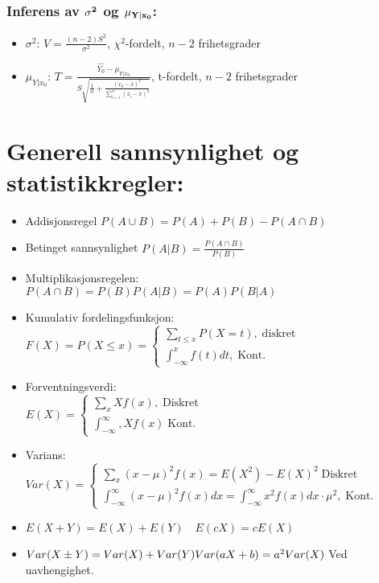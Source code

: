 \documentclass[12pt,a4paper,twocolumn,twoside]{article}
\begin{document}
\subsubsection*{Inferens av $\bold{\sigma^2}$ og $\bold{\mu_{Y|x_0}}$:}
\begin{itemize}[topsep=0pt,itemsep=0pt, partopsep=0pt]
    \item $\sigma^2$: $V=\frac{(n-2)S^2}{\sigma^2}$, $\chi^2$-fordelt, $n-2$ frihetsgrader
    \item $\mu_{Y|x_0}$: $T=\frac{\hat{Y_0}-\mu_{Y|x_0}}{S\sqrt{\frac{1}{n}+\frac{(x_0-\overline{x})^2}{\sum_{i=1}^n(x_i-\overline{x})^2}}}$, t-fordelt, $n-2$ frihetsgrader
\end{itemize}

%
%
\section*{Generell sannsynlighet og statistikkregler:}
\begin{itemize}[topsep=0pt,itemsep=0pt, partopsep=0pt]
    \item Addisjonsregel $P(A\cup B)=P(A)+P(B)-P(A\cap B)$
    \item Betinget sannsynlighet $P(A|B)=\frac{P(A\cap B)}{P(B)}$
    \item Multiplikasjonsregelen:\\$P(A\cap B)=P(B)P(A|B)=P(A)P(B|A)$
    \item Kumulativ fordelingsfunksjon: $F(X)=P(X\leq x)=\begin{cases}
        \sum_{t\leq x} P(X=t),\;\text{diskret}\\
        \int_{-\infty}^x f(t)dt,\;\text{Kont.}
    \end{cases}$
    \item Forventningsverdi:\\$E(X)=\begin{cases}
        \sum_x Xf(x),\;\text{Diskret}\\
        \int_{-\infty}^\infty,Xf(x)\;\text{Kont.}
    \end{cases}$
    \item Varians:\\$Var(X)=\begin{cases}
        \sum_x(x-\mu)^2f(x)=E(X^2)-E(X)^2\;\text{Diskret}\\
        \int_{-\infty}^\infty (x-\mu)^2f(x)dx = \int_{-\infty}^{\infty}x^2f(x)dx\cdot\mu^2,\;\text{Kont.}
    \end{cases}$
    \item $E(X+Y) = E(X)+E(Y)\quad E(cX)=cE(X)$
    \item $Var(X\pm Y) = Var(X)+Var(Y)\\ Var(aX+b)=a^2Var(X)$ Ved uavhengighet.
\end{itemize}
%
%
\end{document}
